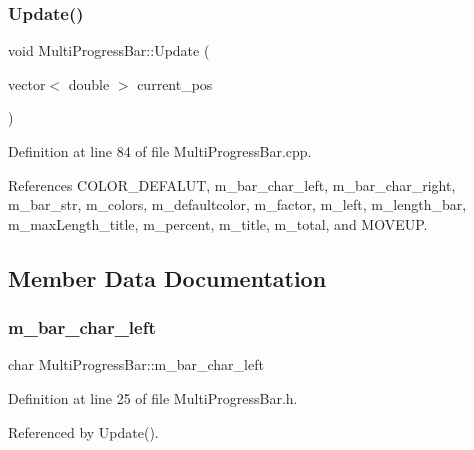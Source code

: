 \subsubsection{Update()\hspace{0.1cm}{\footnotesize\ttfamily [2/2]}}
{\footnotesize\ttfamily void Multi\+Progress\+Bar\+::\+Update (\begin{DoxyParamCaption}\item[{vector$<$ double $>$}]{current\+\_\+pos }\end{DoxyParamCaption})}



Definition at line 84 of file Multi\+Progress\+Bar.\+cpp.



References C\+O\+L\+O\+R\+\_\+\+D\+E\+F\+A\+L\+UT, m\+\_\+bar\+\_\+char\+\_\+left, m\+\_\+bar\+\_\+char\+\_\+right, m\+\_\+bar\+\_\+str, m\+\_\+colors, m\+\_\+defaultcolor, m\+\_\+factor, m\+\_\+left, m\+\_\+length\+\_\+bar, m\+\_\+max\+Length\+\_\+title, m\+\_\+percent, m\+\_\+title, m\+\_\+total, and M\+O\+V\+E\+UP.



\subsection{Member Data Documentation}
\mbox{\label{classMultiProgressBar_a0988d7a44c4eb92aa791b73ed0a5c040_a0988d7a44c4eb92aa791b73ed0a5c040}} 
\subsubsection{m\+\_\+bar\+\_\+char\+\_\+left}
{\footnotesize\ttfamily char Multi\+Progress\+Bar\+::m\+\_\+bar\+\_\+char\+\_\+left\hspace{0.3cm}{\ttfamily [protected]}}



Definition at line 25 of file Multi\+Progress\+Bar.\+h.



Referenced by Update().

\mbox{\label{classMultiProgressBar_afaae2b720a00fd64a4a8298dba36268c_afaae2b720a00fd64a4a8298dba36268c}} 
